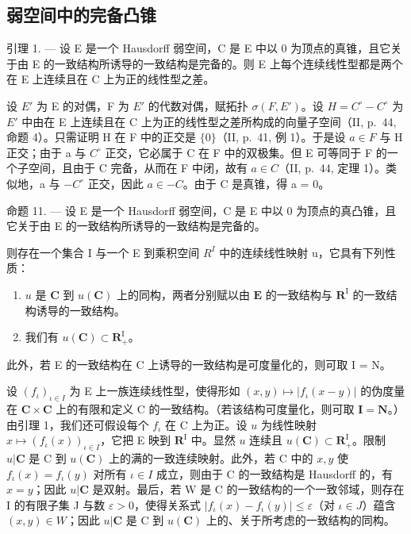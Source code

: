 \subsection{弱空间中的完备凸锥}

引理 1. --- 设 E 是一个 Hausdorff 弱空间，C 是 E 中以 0 为顶点的真锥，且它关于由 E 的一致结构所诱导的一致结构是完备的。则 E 上每个连续线性型都是两个在 E 上连续且在 C 上为正的线性型之差。

设 \(E'\) 为 E 的对偶，F 为 \(E'\) 的代数对偶，赋拓扑 \(\sigma(F, E')\)。设 \(H = C^{\circ} - C^{\circ}\) 为 \(E'\) 中由在 E 上连续且在 C 上为正的线性型之差所构成的向量子空间（II, p.~44, 命题 4）。只需证明 H 在 F 中的正交是 \(\{0\}\)（II, p.~41, 例 1）。于是设 \(a \in F\) 与 H 正交；由于 a 与 \(C^{\circ}\) 正交，它必属于 C 在 F 中的双极集。但 E 可等同于 F 的一个子空间，且由于 C 完备，从而在 F 中闭，故有 \(a \in C\)（II, p.~44, 定理 1）。类似地，a 与 \(-C^{\circ}\) 正交，因此 \(a \in -C\)。由于 C 是真锥，得 a = 0。

命题 11. --- 设 E 是一个 Hausdorff 弱空间，C 是 E 中以 0 为顶点的真凸锥，且它关于由 E 的一致结构所诱导的一致结构是完备的。

则存在一个集合 I 与一个 E 到乘积空间 \(R^{I}\) 中的连续线性映射 u，它具有下列性质：

\begin{enumerate}
\def\labelenumi{\alph{enumi})}
\item
  \(u\) 是 \(\mathbf{C}\) 到 \(u(\mathbf{C})\) 上的同构，两者分别赋以由 \(\mathbf{E}\) 的一致结构与 \(\mathbf{R}^{\mathrm{I}}\) 的一致结构诱导的一致结构。
\item
  我们有 \(u(\mathbf{C}) \subset \mathbf{R}_{+}^{\mathrm{I}}\)。
\end{enumerate}

此外，若 E 的一致结构在 C 上诱导的一致结构是可度量化的，则可取 I = N。

设 \((f_{\iota})_{\iota \in I}\) 为 E 上一族连续线性型，使得形如 \((x, y) \mapsto |f_{\iota}(x - y)|\) 的伪度量在 \(\mathbf{C} \times \mathbf{C}\) 上的有限和定义 C 的一致结构。（若该结构可度量化，则可取 \(\mathbf{I} = \mathbf{N}\)。）由引理 1，我们还可假设每个 \(f_{\iota}\) 在 C 上为正。设 \(u\) 为线性映射 \(x \mapsto (f_{\iota}(x))_{\iota \in I}\)，它把 E 映到 \(\mathbf{R}^{\mathrm{I}}\) 中。显然 \(u\) 连续且 \(u(\mathbf{C}) \subset \mathbf{R}_{+}^{\mathrm{I}}\)。限制 \(u|\mathbf{C}\) 是 C 到 \(u(\mathbf{C})\) 上的满的一致连续映射。此外，若 C 中的 \(x, y\) 使 \(f_{\iota}(x) = f_{\iota}(y)\) 对所有 \(\iota \in I\) 成立，则由于 C 的一致结构是 Hausdorff 的，有 \(x = y\)；因此 \(u|\mathbf{C}\) 是双射。最后，若 W 是 C 的一致结构的一个一致邻域，则存在 I 的有限子集 J 与数 \(\varepsilon > 0\)，使得关系式 \(|f_{\iota}(x) - f_{\iota}(y)| \leqslant \varepsilon\)（对 \(\iota \in J\)）蕴含 \((x, y) \in W\)；因此 \(u|\mathbf{C}\) 是 C 到 \(u(\mathbf{C})\) 上的、关于所考虑的一致结构的同构。

